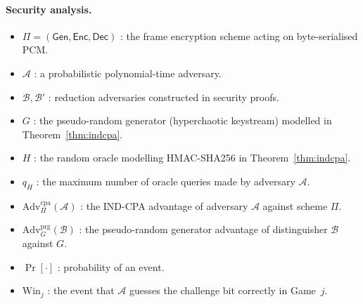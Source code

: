 \documentclass[pdflatex,sn-mathphys-num]{sn-jnl}%
\theoremstyle{thmstyleone}%
\theoremstyle{thmstyletwo}%
\theoremstyle{thmstylethree}%
\begin{document}
\paragraph{Security analysis.}
\begin{itemize}[leftmargin=2em]
\item $\Pi=(\mathsf{Gen},\mathsf{Enc},\mathsf{Dec})$ : the frame encryption scheme acting on byte-serialised PCM.
\item $\mathcal{A}$ : a probabilistic polynomial-time adversary.
\item $\mathcal{B},\mathcal{B}'$ : reduction adversaries constructed in security proofs.
\item $G$ : the pseudo-random generator (hyperchaotic keystream) modelled in Theorem~\ref{thm:indcpa}.
\item $H$ : the random oracle modelling HMAC-SHA256 in Theorem~\ref{thm:indcpa}.
\item $q_H$ : the maximum number of oracle queries made by adversary $\mathcal{A}$.
\item $\mathrm{Adv}^{\mathrm{cpa}}_{\Pi}(\mathcal{A})$ : the IND-CPA advantage of adversary $\mathcal{A}$ against scheme $\Pi$.
\item $\mathrm{Adv}^{\mathrm{prg}}_{G}(\mathcal{B})$ : the pseudo-random generator advantage of distinguisher $\mathcal{B}$ against $G$.
\item $\Pr[\cdot]$ : probability of an event.
\item $\mathrm{Win}_j$ : the event that $\mathcal{A}$ guesses the challenge bit correctly in Game~$j$.
\end{itemize}
\end{document}
